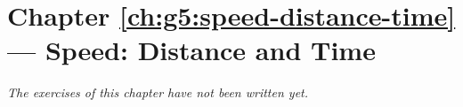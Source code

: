 \section*{Chapter \ref{ch:g5:speed-distance-time} --- Speed: Distance and Time}


\emph{The exercises of this chapter have not been written yet.}
